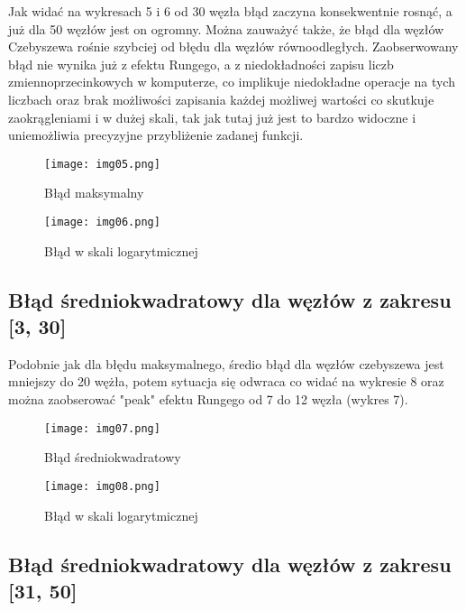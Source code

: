 \documentclass{article}
\begin{document}
Jak widać na wykresach 5 i 6 od 30 węzła błąd zaczyna konsekwentnie rosnąć, a już dla 50 węzłów jest on ogromny. Można zauważyć także, że błąd dla węzłów Czebyszewa rośnie szybciej od błędu dla węzłów równoodległych. Zaobserwowany błąd nie wynika już z efektu Rungego, a z niedokładności zapisu liczb zmiennoprzecinkowych w komputerze, co implikuje niedokładne operacje na tych liczbach oraz brak możliwości zapisania każdej możliwej wartości co skutkuje zaokrągleniami i w dużej skali, tak jak tutaj już jest to bardzo widoczne i uniemożliwia precyzyjne przybliżenie zadanej funkcji.

\begin{figure}[H]
  \begin{minipage}[b]{0.49\textwidth}
    \texttt{[image: img05.png]}
    \caption{Błąd maksymalny}
  \end{minipage}
  \hfill
  \begin{minipage}[b]{0.49\textwidth}
    \texttt{[image: img06.png]}
    \caption{Błąd w skali logarytmicznej}
  \end{minipage}
\end{figure}

\subsection{Błąd średniokwadratowy dla węzłów z zakresu [3, 30]}

Podobnie jak dla błędu maksymalnego, średio błąd dla węzłów czebyszewa jest mniejszy do 20 wężła, potem sytuacja się odwraca co widać na wykresie 8 oraz można zaobserować "peak" efektu Rungego od 7 do 12 węzła (wykres 7).

\begin{figure}[H]
  \begin{minipage}[b]{0.49\textwidth}
    \texttt{[image: img07.png]}
    \caption{Błąd średniokwadratowy}
  \end{minipage}
  \hfill
  \begin{minipage}[b]{0.49\textwidth}
    \texttt{[image: img08.png]}
    \caption{Błąd w skali logarytmicznej}
  \end{minipage}
\end{figure}

\subsection{Błąd średniokwadratowy dla węzłów z zakresu [31, 50]}
\end{document}
